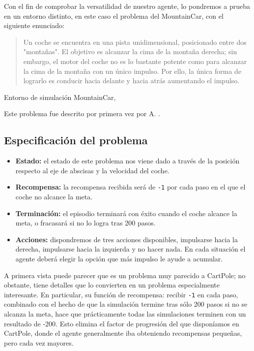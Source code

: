 Con el fin de comprobar la versatilidad de nuestro agente, lo pondremos a prueba en un entorno distinto, en este caso el problema del MountainCar, con el siguiente enunciado:

\begin{quote}
    Un coche se encuentra en una pista unidimensional, posicionado entre dos "montañas". El objetivo es alcanzar la cima de la montaña derecha; sin embargo, el motor del coche no es lo bastante potente como para alcanzar la cima de la montaña con un único impulso. Por ello, la única forma de lograrlo es conducir hacia delante y hacia atrás aumentando el impulso.
\end{quote}

%
       {Entorno de simulación MountainCar, \citet{brockman2016openai}}

Este problema fue descrito por primera vez por A. \citet{Moore90efficientmemory-based}.

\subsection{Especificación del problema}

\begin{itemize}
    \item \textbf{Estado:} el estado de este problema nos viene dado a través de la posición respecto al eje de abscisas y la velocidad del coche.
    \item \textbf{Recompensa:} la recompensa recibida será de \texttt{-1} por cada paso en el que el coche no alcance la meta.
    \item \textbf{Terminación:} el episodio terminará con éxito cuando el coche alcance la meta, o fracasará si no lo logra tras 200 pasos.
    \item \textbf{Acciones:} dispondremos de tres acciones disponibles, impulsarse hacia la derecha, impulsarse hacia la izquierda y no hacer nada. En cada situación el agente deberá elegir la opción que más impulso le ayude a acumular.
\end{itemize}

A primera vista puede parecer que es un problema muy parecido a CartPole; no obstante, tiene detalles que lo convierten en un problema especialmente interesante. En particular, su función de recompensa: recibir \texttt{-1} en cada paso, combinado con el hecho de que la simulación termine tras sólo 200 pasos si no se alcanza la meta, hace que prácticamente todas las simulaciones terminen con un resultado de -200. Esto elimina el factor de progresión del que disponíamos en CartPole, donde el agente generalmente iba obteniendo recompensas pequeñas, pero cada vez mayores.


